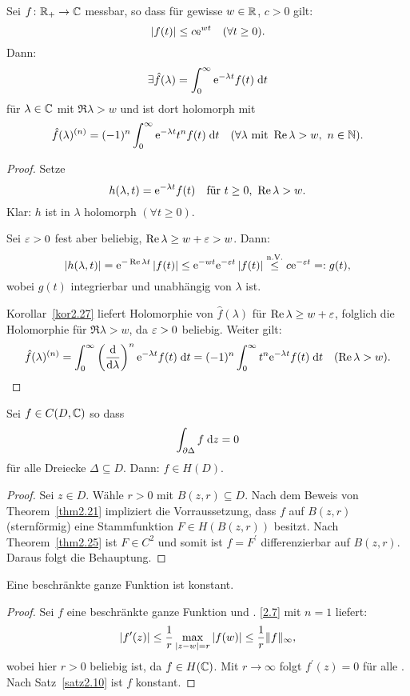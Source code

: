 \documentclass[a4paper,twoside,DIV15,BCOR12mm]{scrbook}
\begin{document}
\begin{bsp}[Laplacetransformation]\label{bsp2.28}
Sei $f\colon\mathbb{R}_+\rightarrow\mathbb{C}$ messbar, so dass für gewisse $w\in\mathbb{R}$, $c>0$ gilt:
\[\left\lvert f(t)\right\lvert\leq c\mathrm{e}^{wt}\quad(\forall t\geq 0).\]
Dann:
\[\exists\hat{f}(\lambda)=\int_{0}^{\infty}{\mathrm{e}^{-\lambda t}f(t)}\;\mathrm{d} t\]
für $\lambda\in\mathbb{C}$ mit $\Re{\lambda}>w$ und ist dort holomorph mit
\[\hat{f}(\lambda)^{(n)}=(-1)^n\integral{0}{\infty}{\e^{-\lambda t}t^n f(t)}{t}\quad(\forall\lambda\text{ mit }\Re{\lambda}>w,\ \nat{n}).\]

\begin{proof} Setze
\[h(\lambda, t)=\e^{-\lambda t}f(t)\quad\text{für }t\geq 0,\ \Re{\lambda}>w.\]
Klar: $h$ ist in $\lambda$ holomorph $(\forall t\geq 0)$.

Sei $\varepsilon >0$ fest aber beliebig, $\operatorname{Re}{\lambda}\geq w+\varepsilon > w$. Dann:
\[\left\lvert h(\lambda,t)\right\lvert=\mathrm{e}^{-\operatorname{Re}{\lambda}t}\left\lvert f(t)\right\lvert\leq\mathrm{e}^{-wt}\mathrm{e}^{-\varepsilon t}\left\lvert f(t)\right\lvert\overset{\text{n.V.}}{\leq}c\mathrm{e}^{-\varepsilon t}=: g(t),\]
wobei $g(t)$ integrierbar und unabhängig von $\lambda$ ist.

Korollar~\ref{kor2.27} liefert Holomorphie von $\hat{f}(\lambda)$ für $\operatorname{Re}{\lambda}\geq w+\varepsilon$, folglich die Holomorphie für $\Re{\lambda}>w$, da $\varepsilon>0$ beliebig. Weiter gilt:
\[\hat{f}(\lambda)^{(n)}=\int_{0}^{\infty}{\left(\frac{\mathrm{d}}{\mathrm{d}\lambda}\right)^n\mathrm{e}^{-\lambda t}f(t)}\;\mathrm{d} t=(-1)^n\int_{0}^{\infty}{t^n\mathrm{e}^{-\lambda t}f(t)}\;\mathrm{d} t\quad(\operatorname{Re}{\lambda}>w).\qedhere\]
\end{proof}
\end{bsp}

\begin{kor}[Morera]\label{kor2.29}
Sei $f\in C(D,\mathbb{C})$ so dass
\[\int_{\partial\Delta}^{}{f}\;\mathrm{d} z=0\]
für alle Dreiecke $\Delta\subseteq D$. Dann: $f\in H(D)$.
\end{kor}

\begin{proof} Sei $z\in D$. Wähle $r>0$ mit $B(z,r)\subseteq D$. Nach dem Beweis von Theorem~\ref{thm2.21} impliziert die Vorraussetzung, dass $f$ auf $B(z,r)$ (sternförmig) eine Stammfunktion $F\in H(B(z,r))$ besitzt. Nach Theorem~\ref{thm2.25} ist $F\in C^2$ und somit ist $f=F^\prime$ differenzierbar auf $B(z,r)$. Daraus folgt die Behauptung.
\end{proof}


\begin{thm}[Liouville] \label{thm2.30}
  Eine beschränkte ganze Funktion ist konstant.
\end{thm}
\begin{proof}
  Sei $f$ eine beschränkte ganze Funktion und . \eqref{2.7} mit $n=1$ liefert:
  \[ \left\lvert f^\prime(z)\right\lvert \leq \frac1r \max_{\left\lvert z-w\right\lvert=r}{\left\lvert f(w)\right\lvert} \leq \frac1r \Vert f \Vert _\infty, \]
  wobei hier $r>0$ beliebig ist, da $f\in H(\mathbb{C})$. Mit $r\to\infty$ folgt $f^\prime(z)=0$ für alle . Nach Satz~\ref{satz2.10} ist $f$ konstant.
\end{proof}
\end{document}
